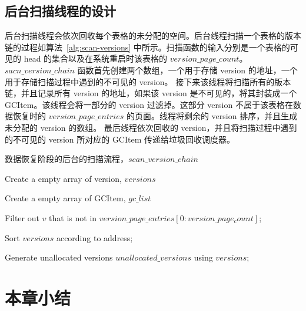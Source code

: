 \subsection{后台扫描线程的设计}
\label{ssec:background-scan}

后台扫描线程会依次回收每个表格的未分配的空间。后台线程扫描一个表格的版本链的过程如算法~\ref{alg:scan-versions} 中所示。扫描函数的输入分别是一个表格的可见的 head 的集合以及在系统重启时该表格的 $version\_page\_count$。$sacn\_version\_chain$ 函数首先创建两个数组，一个用于存储 version 的地址，一个用于存储扫描过程中遇到的不可见的 version。
接下来该线程将扫描所有的版本链，并且记录所有 version 的地址，如果该 version 是不可见的，将其封装成一个 GCItem。该线程会将一部分的 version 过滤掉。这部分 version 不属于该表格在数据恢复时的 $version\_page\_entries$ 的页面。线程将剩余的 version 排序，并且生成未分配的 version 的数组。
最后线程依次回收的 version，并且将扫描过程中遇到的不可见的 version 所对应的 GCItem 传递给垃圾回收调度器。


\begin{algorithm}[ht]
    \caption{数据恢复阶段的后台的扫描流程，$scan\_version\_chain$}
    \label{alg:scan-versions}
    \BlankLine

    Create a empty array of version, $versions$

    Create a empty array of GCItem, $gc\_list$


    Filter out $v$ that is not in $version\_page\_entries[0:version\_page_count]$;

    Sort $versions$ according to address;


    Generate unallocated versions $unallocated\_versions$ using $versions$;



\end{algorithm}

\section{本章小结}

